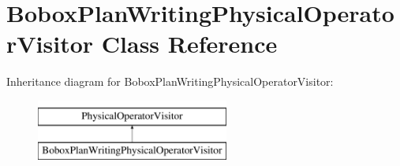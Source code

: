 \hypertarget{class_bobox_plan_writing_physical_operator_visitor}{\section{Bobox\+Plan\+Writing\+Physical\+Operator\+Visitor Class Reference}
\label{class_bobox_plan_writing_physical_operator_visitor}
}
Inheritance diagram for Bobox\+Plan\+Writing\+Physical\+Operator\+Visitor\+:\begin{figure}[H]
\begin{center}
\leavevmode
\includegraphics[height=2.000000cm]{class_bobox_plan_writing_physical_operator_visitor}
\end{center}
\end{figure}
